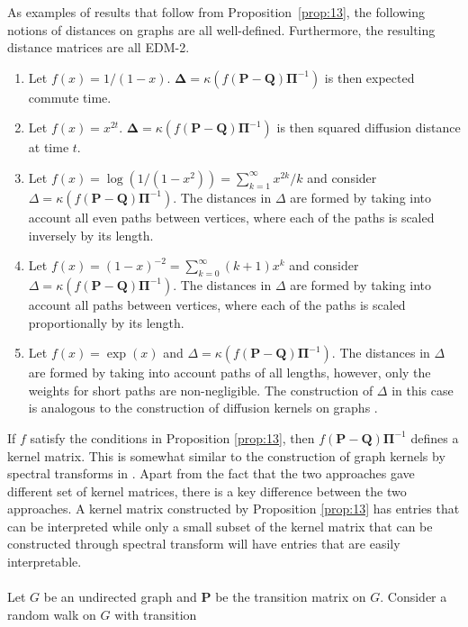 \documentclass[10pt,twocolumn]{article}
\numberwithin{equation}{section}
\begin{document}
As examples of results that follow from Proposition~\ref{prop:13}, the
following notions of distances on graphs are all
well-defined. Furthermore, the resulting distance matrices are all
EDM-2.
\begin{enumerate}
\item Let $f(x) = 1/(1-x)$. $\bm{\Delta} = \kappa(f(\mathbf{P} -
  \mathbf{Q})\bm{\Pi}^{-1})$ is then expected commute time.
\item Let $f(x) = x^{2t}$. $\bm{\Delta} = \kappa(f(\mathbf{P} -
  \mathbf{Q})\bm{\Pi}^{-1})$ is then squared diffusion distance at
  time $t$. 
\item Let $f(x) = \log(1/(1-x^2)) = \sum_{k=1}^{\infty}{x^{2k}/k}$ and
  consider $\Delta = \kappa(f(\mathbf{P} -
  \mathbf{Q})\bm{\Pi}^{-1})$. The distances in $\Delta$ are formed by
  taking into account all even paths between vertices, where each of the
  paths is scaled inversely by its length.
\item Let $f(x) = (1-x)^{-2} = \sum_{k=0}^{\infty}{(k+1)x^k}$ and
  consider $\Delta = \kappa(f(\mathbf{P} -
  \mathbf{Q})\bm{\Pi}^{-1})$. The distances in $\Delta$ are formed by
  taking into account all paths between vertices, where each of the paths
  is scaled proportionally by its length.
\item Let $f(x) = \exp(x)$ and $\Delta = \kappa(f(\mathbf{P}
  - \mathbf{Q})\bm{\Pi}^{-1})$. The distances in $\Delta$ are formed by
  taking into account paths of all lengths, however, only the weights for
  short paths are non-negligible. The construction of $\Delta$ in this
  case is analogous to the construction of diffusion
  kernels on graphs \cite{kondor02:_diffus}. 
\end{enumerate}
%
%
If $f$ satisfy the conditions in Proposition \ref{prop:13}, then
$f(\mathbf{P} - \mathbf{Q})\bm{\Pi}^{-1}$ defines a kernel
matrix. This is somewhat similar to the construction of graph kernels
by spectral transforms in
\cite{zhu05:_semi,chapelle03:_clust_kernel_semi_super_learn,smola03:_kernel}.
Apart from the fact that the two approaches gave different set of
kernel matrices, there is a key difference between the two
approaches. A kernel matrix constructed by Proposition \ref{prop:13}
has entries that can be interpreted while only a small subset of the
kernel matrix that can be constructed through spectral transform will
have entries that are easily interpretable. \\ \\
\noindent
Let $G$ be an undirected graph and $\mathbf{P}$ be the transition
matrix on $G$. Consider a random walk on $G$ with transition
\end{document}
